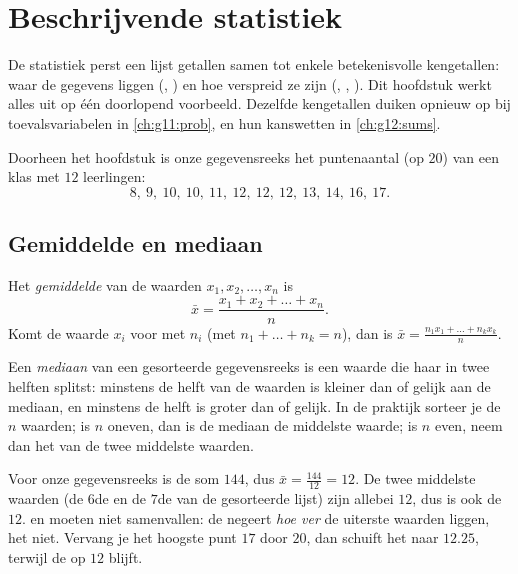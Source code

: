 \chapter{Beschrijvende statistiek}\label{ch:g11:stat}

De statistiek perst een lijst getallen samen tot enkele betekenisvolle
kengetallen: waar de gegevens liggen (, ) en hoe verspreid
ze zijn (, , ). Dit hoofdstuk werkt alles
uit op één doorlopend voorbeeld. Dezelfde kengetallen duiken opnieuw op bij
toevalsvariabelen in \cref{ch:g11:prob}, en hun kanswetten in
\cref{ch:g12:sums}.

Doorheen het hoofdstuk is onze gegevensreeks het puntenaantal (op $20$) van
een klas met $12$ leerlingen:
\[
8,\ 9,\ 10,\ 10,\ 11,\ 12,\ 12,\ 12,\ 13,\ 14,\ 16,\ 17 .
\]

\section{Gemiddelde en mediaan}

\begin{definition}[Gemiddelde]\label{def:g11:stat:mean}
Het \emph{gemiddelde} van de waarden
$x_1, x_2, \dots, x_n$ is
\[
\bar x = \frac{x_1 + x_2 + \dots + x_n}{n}.
\]
Komt de waarde $x_i$ voor met  $n_i$ (met
$n_1 + \dots + n_k = n$), dan is
$\bar x = \frac{n_1 x_1 + \dots + n_k x_k}{n}$.
\end{definition}

\begin{definition}[Mediaan]\label{def:g11:stat:median}
Een \emph{mediaan} van een gesorteerde gegevensreeks is een
waarde die haar in twee helften splitst: minstens de helft van de waarden is
kleiner dan of gelijk aan de mediaan, en minstens de helft is groter dan of
gelijk. In de praktijk sorteer je de $n$ waarden; is $n$ oneven, dan is de
mediaan de middelste waarde; is $n$ even, neem dan het  van de twee
middelste waarden.
\end{definition}

\begin{example}\label{ex:g11:stat:meanmedian}
Voor onze gegevensreeks is de som $144$, dus $\bar x = \frac{144}{12} = 12$.
De twee middelste waarden (de $6$de en de $7$de van de gesorteerde lijst)
zijn allebei $12$, dus is ook de  $12$.  en  moeten
niet samenvallen: de  negeert \emph{hoe ver} de uiterste waarden
liggen, het  niet. Vervang je het hoogste punt $17$ door $20$, dan
schuift het  naar $12.25$, terwijl de  op $12$ blijft.
\end{example}

